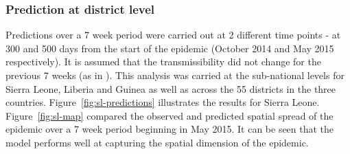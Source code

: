 \documentclass[11pt,]{article}
\begin{document}
\subsubsection{Prediction at district level}

Predictions over a 7 week period were carried out at 2 different time points - at 300 and
500 days from the start of the epidemic (October 2014 and May 2015
respectively). It is assumed that the 
transmissibility did not change for the previous 7 weeks (as in
\citep{team2015west}). This analysis was carried at the sub-national
levels for Sierra Leone, Liberia and
Guinea as well as across the 55 districts in the three countries.
Figure~\ref{fig:sl-predictions} illustrates the results for
Sierra Leone.  Figure~\ref{fig:sl-map} compared the observed and
predicted spatial spread of the epidemic over a 7 week period
beginning in May 2015. It can be seen that the model performs well at
capturing the spatial dimension of the epidemic.
\end{document}
